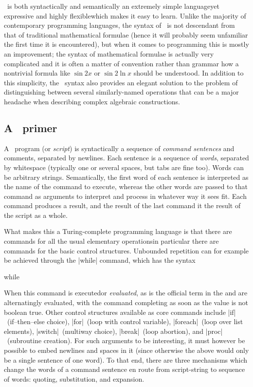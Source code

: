 \documentclass{mtmtcl}
\theoremstyle{plain}
\theoremstyle{remark}
\begin{document}
\Tcl\ is both syntactically and semantically an extremely simple 
language\Ldash yet expressive and highly flexible\Rdash which makes 
it easy to learn. Unlike the majority of contemporary programming 
languages, the syntax of \Tcl\ is not descendant from that of 
traditional mathematical formulae (hence it will probably seem 
unfamiliar the first time it is encountered), but when it comes to 
programming this is mostly an improvement; the syntax of mathematical 
formulae is actually very complicated and it is often a matter of 
convention rather than grammar how a nontrivial formula like $\sin 
2x$ or $\sin 2\ln x$ should be understood. In addition to this 
simplicity, the \Tcl\ syntax also provides an elegant solution to 
the problem of distinguishing between several similarly-named 
operations that can be a major headache when describing complex 
algebraic constructions.


\subsection{A \Tcl\ primer}

A \Tcl\ program (or \emph{script}) is syntactically a sequence of 
\emph{command sentences} and comments, separated by newlines. Each 
sentence is a sequence of \emph{words}, separated by whitespace 
(typically one or several spaces, but tabs are fine too). Words can 
be arbitrary strings. Semantically, the first word of each sentence 
is interpreted as the name of the command to execute, whereas the 
other words are passed to that command as arguments to interpret 
and process in whatever way it sees fit. Each command produces 
a result, and the result of the last command it the result of the 
script as a whole.

What makes this a Turing-complete programming language is that there 
are commands for all the usual elementary operations\Dash in 
particular there are commands for the basic control structures. 
Unbounded repetition can for example be achieved through the |while| 
command, which has the syntax
\begin{displaysyntax}
  while  
\end{displaysyntax}
When this command is executed\Ldash or \emph{evaluated}, as is the 
official term in \Tcl\Rdash the  and  
are alternatingly evaluated, with the command completing as soon as 
the  value is not boolean true. Other control 
structures available as core commands include |if|~(if--then--else 
choice), |for|~(loop with control variable), |foreach|~(loop over 
list elements), |switch|~(multiway choice), |break|~(loop abortion), 
and |proc|~(subroutine creation).
For such  arguments to be interesting, it must however 
be possible to embed newlines and spaces in it (since otherwise the 
 above would only be a single sentence of one word). 
To that end, there are three mechanisms which change the words of a 
command sentence en route from script-string to sequence of words: 
quoting, substitution, and expansion.
\end{document}
